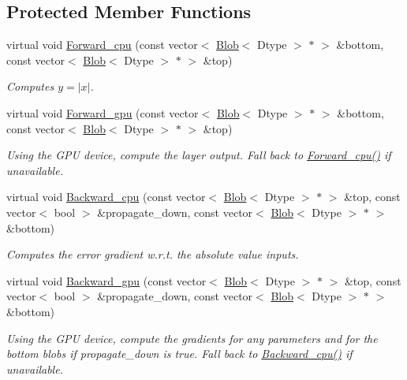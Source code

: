 \subsection*{Protected Member Functions}
\begin{DoxyCompactItemize}
\item 
virtual void \hyperlink{classcaffe_1_1AbsValLayer_a6f9bc11e2459c982b44482305390dfc7}{Forward\+\_\+cpu} (const vector$<$ \hyperlink{classcaffe_1_1Blob}{Blob}$<$ Dtype $>$ $\ast$ $>$ \&bottom, const vector$<$ \hyperlink{classcaffe_1_1Blob}{Blob}$<$ Dtype $>$ $\ast$ $>$ \&top)
\begin{DoxyCompactList}\small\item\em Computes $ y = |x| $. \end{DoxyCompactList}\item 
virtual void \hyperlink{classcaffe_1_1AbsValLayer_abe4da39f8844524e745a92d9766adccc}{Forward\+\_\+gpu} (const vector$<$ \hyperlink{classcaffe_1_1Blob}{Blob}$<$ Dtype $>$ $\ast$ $>$ \&bottom, const vector$<$ \hyperlink{classcaffe_1_1Blob}{Blob}$<$ Dtype $>$ $\ast$ $>$ \&top)\hypertarget{classcaffe_1_1AbsValLayer_abe4da39f8844524e745a92d9766adccc}{}\label{classcaffe_1_1AbsValLayer_abe4da39f8844524e745a92d9766adccc}

\begin{DoxyCompactList}\small\item\em Using the G\+PU device, compute the layer output. Fall back to \hyperlink{classcaffe_1_1AbsValLayer_a6f9bc11e2459c982b44482305390dfc7}{Forward\+\_\+cpu()} if unavailable. \end{DoxyCompactList}\item 
virtual void \hyperlink{classcaffe_1_1AbsValLayer_a1d81dee85d0f354986e0f6f984974599}{Backward\+\_\+cpu} (const vector$<$ \hyperlink{classcaffe_1_1Blob}{Blob}$<$ Dtype $>$ $\ast$ $>$ \&top, const vector$<$ bool $>$ \&propagate\+\_\+down, const vector$<$ \hyperlink{classcaffe_1_1Blob}{Blob}$<$ Dtype $>$ $\ast$ $>$ \&bottom)
\begin{DoxyCompactList}\small\item\em Computes the error gradient w.\+r.\+t. the absolute value inputs. \end{DoxyCompactList}\item 
virtual void \hyperlink{classcaffe_1_1AbsValLayer_a9dfa072afd31d0261763074be0a797ec}{Backward\+\_\+gpu} (const vector$<$ \hyperlink{classcaffe_1_1Blob}{Blob}$<$ Dtype $>$ $\ast$ $>$ \&top, const vector$<$ bool $>$ \&propagate\+\_\+down, const vector$<$ \hyperlink{classcaffe_1_1Blob}{Blob}$<$ Dtype $>$ $\ast$ $>$ \&bottom)\hypertarget{classcaffe_1_1AbsValLayer_a9dfa072afd31d0261763074be0a797ec}{}\label{classcaffe_1_1AbsValLayer_a9dfa072afd31d0261763074be0a797ec}

\begin{DoxyCompactList}\small\item\em Using the G\+PU device, compute the gradients for any parameters and for the bottom blobs if propagate\+\_\+down is true. Fall back to \hyperlink{classcaffe_1_1AbsValLayer_a1d81dee85d0f354986e0f6f984974599}{Backward\+\_\+cpu()} if unavailable. \end{DoxyCompactList}\end{DoxyCompactItemize}
